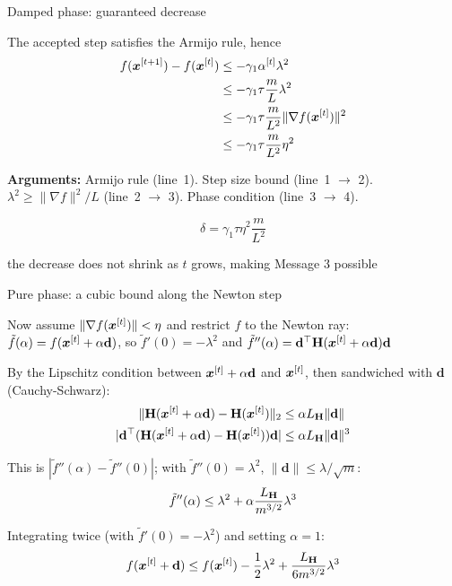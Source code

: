 \documentclass[11pt,compress,t,notes=noshow, xcolor=table]{beamer}
\newcommand{\LH}{L_{\H}}
\begin{document}
\begin{framei}[fs=small]{Damped phase: guaranteed decrease}
\item The accepted step satisfies the Armijo rule, hence
\begin{align*}
f(\bm{x}^{[t+1]}) - f(\bm{x}^{[t]}) &\le - \gamma_1 \alpha^{[t]} \lambda^2 \\
&\le - \gamma_1 \tau \frac{m}{L} \lambda^2 \\
&\le - \gamma_1 \tau \frac{m}{L^2} \|\nabla f(\bm{x}^{[t]})\|^2 \\
&\le - \gamma_1 \tau \frac{m}{L^2} \eta^2
\end{align*}
\item \textbf{Arguments:} Armijo rule (line~1). Step size bound (line~1 $\to$ 2).
$\lambda^2 \ge \|\nabla f\|^2/L$ (line~2 $\to$ 3). Phase condition (line~3 $\to$ 4).
\begin{framed}
$$\delta = \gamma_1 \tau \eta^2 \frac{m}{L^2}$$
\end{framed}
\item[$\Rightarrow$] the decrease does not shrink as $t$ grows, making Message 3 possible
\end{framei}


\begin{framei}[fs=small]{Pure phase: a cubic bound along the Newton step}
\item Now assume $\|\nabla f(\bm{x}^{[t]})\| < \eta$ and restrict $f$ to the Newton ray:
$\tilde{f}(\alpha) = f(\bm{x}^{[t]} + \alpha \mathbf{d})$, so $\tilde{f}'(0) = -\lambda^2$ and
$\tilde{f}''(\alpha) = \mathbf{d}^\top \mathbf{H}(\bm{x}^{[t]} + \alpha \mathbf{d}) \mathbf{d}$
\item By the Lipschitz condition between $\bm{x}^{[t]} + \alpha \mathbf{d}$ and $\bm{x}^{[t]}$, then
sandwiched with $\mathbf{d}$ (Cauchy-Schwarz):
\begin{align*}
\| \H(\xv^{[t]} + \alpha \mathbf{d}) - \H(\xv^{[t]}) \|_2 &\le \alpha \LH \|\mathbf{d}\| \\
| \mathbf{d}^\top ( \H(\xv^{[t]} + \alpha \mathbf{d}) - \H(\xv^{[t]}) ) \mathbf{d} |
&\le \alpha \LH \|\mathbf{d}\|^3
\end{align*}
\item This is $|\tilde{f}''(\alpha) - \tilde{f}''(0)|$; with $\tilde{f}''(0) = \lambda^2$, $\|\mathbf{d}\| \le \lambda/\sqrt{m}$:
$$\tilde{f}''(\alpha) \le \lambda^2 + \alpha \frac{\LH}{m^{3/2}} \lambda^3$$
\item Integrating twice (with $\tilde{f}'(0) = -\lambda^2$) and setting $\alpha = 1$:
$$f(\xv^{[t]} + \mathbf{d}) \le f(\xv^{[t]}) - \frac{1}{2}\lambda^2 + \frac{\LH}{6 m^{3/2}} \lambda^3$$
\end{framei}
\end{document}
